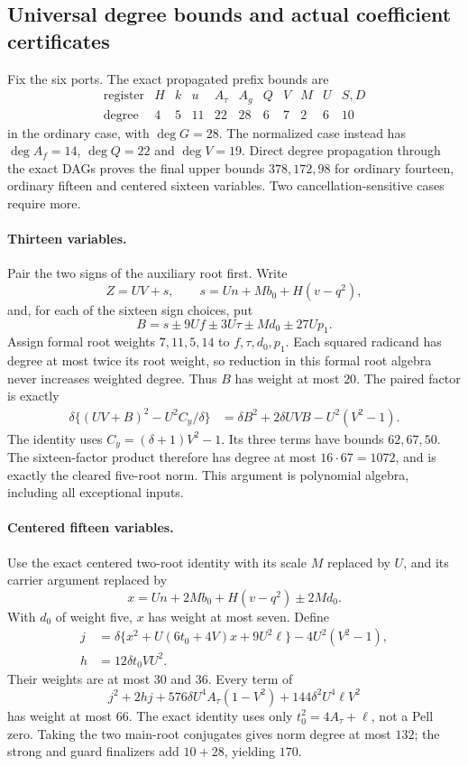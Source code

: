 \subsection{Universal degree bounds and actual coefficient certificates}
Fix the six ports. The exact propagated prefix bounds are
\[
\begin{array}{c|rrrrrrrrrr}
\text{register}&H&k&u&A_\tau&A_g&Q&V&M&U&S,D\\\hline
\text{degree}&4&5&11&22&28&6&7&2&6&10
\end{array}
\]
in the ordinary case, with $\deg G=28$. The normalized case instead has
$\deg A_f=14$, $\deg Q=22$ and $\deg V=19$.
Direct degree propagation through the exact DAGs proves the final upper
bounds $378,172,98$ for ordinary fourteen, ordinary fifteen and centered
sixteen variables. Two cancellation-sensitive cases require more.

\paragraph{Thirteen variables.}
Pair the two signs of the auxiliary root first. Write
\[
 Z=UV+s,\qquad s=Un+Mb_0+H(v-q^2),
\]
and, for each of the sixteen sign choices, put
\[
 B=s\mathbin{\pm}9Uf\mathbin{\pm}3U\tau
     \mathbin{\pm}Md_0\mathbin{\pm}27Up_1.
\]
Assign formal root weights $7,11,5,14$ to $f,\tau,d_0,p_1$.
Each squared radicand has degree at most twice its root weight, so
reduction in this formal root algebra never increases weighted degree.
Thus $B$ has weight at most $20$. The paired factor is exactly
\begin{align*}
 \delta\{(UV+B)^2-U^2C_y/\delta\}
 &=\delta B^2+2\delta UVB-U^2(V^2-1).
\end{align*}
The identity uses $C_y=(\delta+1)V^2-1$. Its three terms have bounds
$62,67,50$. The sixteen-factor product therefore has degree at most
$16\cdot67=1072$, and is exactly the cleared five-root norm.
This argument is polynomial algebra, including all exceptional inputs.

\paragraph{Centered fifteen variables.}
Use the exact centered two-root identity with its scale $M$ replaced by
$U$, and its carrier argument replaced by
\[
 x=Un+2Mb_0+H(v-q^2)\mathbin{\pm}2Md_0.
\]
With $d_0$ of weight five, $x$ has weight at most seven. Define
\begin{align*}
 j&=\delta\{x^2+U(6t_0+4V)x+9U^2\ell\}
      -4U^2(V^2-1),\\
 h&=12\delta t_0VU^2.
\end{align*}
Their weights are at most $30$ and $36$. Every term of
\[
 j^2+2hj+576\delta U^4A_\tau(1-V^2)
       +144\delta^2U^4\ell V^2
\]
has weight at most $66$. The exact identity uses only
$t_0^2=4A_\tau+\ell$, not a Pell zero. Taking the two main-root
conjugates gives norm degree at most $132$; the strong and guard
finalizers add $10+28$, yielding $170$.

